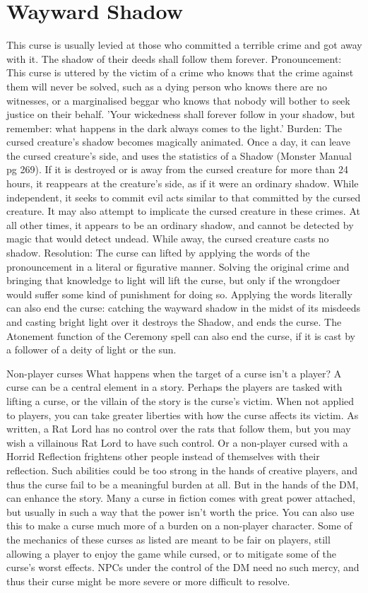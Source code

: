 \documentclass[10pt,a4paper,twoside,twocolumn,openany,bg=print,nodeprecatedcode]{dndbook}
\begin{document}
\section{Wayward Shadow}
This curse is usually levied at those who committed a terrible crime and got away with it. The shadow of their deeds shall follow them forever.
Pronouncement: This curse is uttered by the victim of a crime who knows that the crime against them will never be solved, such as a dying person who knows there are no witnesses, or a marginalised beggar who knows that nobody will bother to seek justice on their behalf. 'Your wickedness shall forever follow in your shadow, but remember: what happens in the dark always comes to the light.'
Burden: The cursed creature's shadow becomes magically animated. Once a day, it can leave the cursed creature's side, and uses the statistics of a Shadow (Monster Manual pg 269). If it is destroyed or is away from the cursed creature for more than 24 hours, it reappears at the creature's side, as if it were an ordinary shadow. While independent, it seeks to commit evil acts similar to that committed by the cursed creature. It may also attempt to implicate the cursed creature in these crimes. At all other times, it appears to be an ordinary shadow, and cannot be detected by magic that would detect undead. While away, the cursed creature casts no shadow.
Resolution: The curse can lifted by applying the words of the pronouncement in a literal or figurative manner. Solving the original crime and bringing that knowledge to light will lift the curse, but only if the wrongdoer would suffer some kind of punishment for doing so. Applying the words literally can also end the curse: catching the wayward shadow in the midst of its misdeeds and casting bright light over it destroys the Shadow, and ends the curse.
The Atonement function of the Ceremony spell can also end the curse, if it is cast by a follower of a deity of light or the sun.
\begin{DndComment}{Non-player curses}
What happens when the target of a curse isn't a player? A curse can be a central element in a story. Perhaps the players are tasked with lifting a curse, or the villain of the story is the curse's victim. When not applied to players, you can take greater liberties with how the curse affects its victim. As written, a Rat Lord has no control over the rats that follow them, but you may wish a villainous Rat Lord to have such control. Or a non-player cursed with a Horrid Reflection frightens other people instead of themselves with their reflection. Such abilities could be too strong in the hands of creative players, and thus the curse fail to be a meaningful burden at all. But in the hands of the DM, can enhance the story. Many a curse in fiction comes with great power attached, but usually in such a way that the power isn't worth the price.
You can also use this to make a curse much more of a burden on a non-player character. Some of the mechanics of these curses as listed are meant to be fair on players, still allowing a player to enjoy the game while cursed, or to mitigate some of the curse's worst effects. NPCs under the control of the DM need no such mercy, and thus their curse might be more severe or more difficult to resolve.
\end{DndComment}
\end{document}
